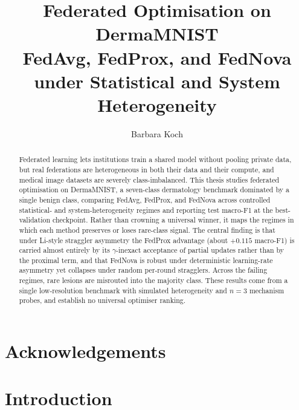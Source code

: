 \documentclass[11pt,a4paper]{report}
\title{Federated Optimisation on DermaMNIST\\
\large FedAvg, FedProx, and FedNova under Statistical and System Heterogeneity}
\author{Barbara Koch}
\date{}
\begin{document}

\maketitle

\begin{abstract}
Federated learning lets institutions train a shared model without pooling private
data, but real federations are heterogeneous in both their data and their compute,
and medical image datasets are severely class-imbalanced. This thesis studies
federated optimisation on DermaMNIST, a seven-class dermatology benchmark
dominated by a single benign class, comparing FedAvg, FedProx, and FedNova across
controlled statistical- and system-heterogeneity regimes and reporting test
macro-F1 at the best-validation checkpoint. Rather than crowning a universal
winner, it maps the regimes in which each method preserves or loses rare-class
signal. The central finding is that under Li-style straggler asymmetry the FedProx
advantage (about $+0.115$ macro-F1) is carried almost entirely by its
$\gamma$-inexact acceptance of partial updates rather than by the proximal term,
and that FedNova is robust under deterministic learning-rate asymmetry yet
collapses under random per-round stragglers. Across the failing regimes, rare
lesions are misrouted into the majority class. These results come from a single
low-resolution benchmark with simulated heterogeneity and $n=3$ mechanism probes,
and establish no universal optimiser ranking.
\end{abstract}

\chapter*{Acknowledgements}

\tableofcontents
\listoffigures
\listoftables


\chapter{Introduction}
\label{ch:intro}
\end{document}
